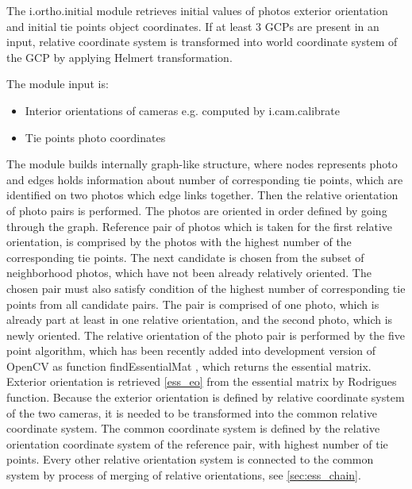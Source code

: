 \documentclass[a4paper,12pt]{article}
\begin{document}
The i.ortho.initial module retrieves initial values of photos exterior orientation and initial tie points object coordinates. If at least 3 GCPs are 
present in an input, relative coordinate system is transformed into world coordinate system of the GCP by applying Helmert transformation. 


The module input is: 
\begin{itemize}
\item Interior orientations of cameras e.g. computed by i.cam.calibrate
\item Tie points photo coordinates 
\end{itemize}




The module builds internally graph-like structure, where nodes represents photo and edges holds information 
about number of corresponding tie points, which are identified on two photos which edge links together.
Then the relative orientation of photo pairs is performed. The photos are oriented in order defined by going through the graph. 
Reference pair of photos which is taken for the first relative orientation, is comprised by the photos with the highest number of the corresponding tie points.
The next candidate is chosen from the subset of neighborhood photos, which have not been already relatively oriented. The chosen pair 
must also satisfy condition of the highest number of corresponding tie points from all candidate pairs. The pair is comprised of one photo, which is already 
part at least in one relative orientation, and the second photo, which is newly oriented. The relative orientation of the photo 
pair is performed by  the five point algorithm, which has been recently added into development version of OpenCV as function findEssentialMat \cite{calib_manual2013opencv},
which returns the essential matrix. Exterior orientation is retrieved \ref{ess_eo} from the essential matrix by Rodrigues \cite{calib_manual2013opencv} 
function. Because the exterior orientation is defined by relative coordinate system of the two cameras, it is needed to be transformed into 
the common relative coordinate system. The common coordinate system is defined by the relative orientation coordinate system of the reference pair, with highest 
number of tie points.
Every other relative orientation system is connected to the common system by process of merging of relative orientations, see \ref{sec:ess_chain}.
\end{document}
